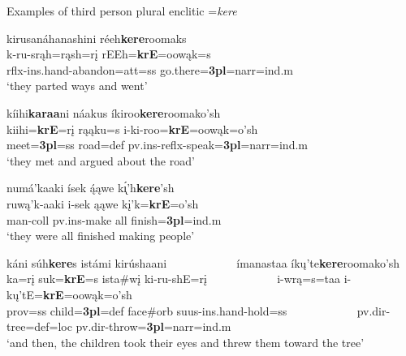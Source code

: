 \begin{exe}

\item\label{3rdpersonplural} Examples of third person plural enclitic =\textit{kere}

	\begin{xlist}
	
	\item\label{3rdpersonplural1}
	\glll kirusanáhanashini réeh\textbf{kere}roomaks\\
	k-ru-srąh=rąsh=rį rEEh=\textbf{krE}=oowąk=s\\
	rflx-ins.hand-\textnormal{abandon}=att=ss \textnormal{go.there}=\textbf{3pl}=narr=ind.m\\
	\glt `they parted ways and went' \citep[9]{hollow1973a}

	\item\label{3rdpersonplural2}
	\glll kíihi\textbf{karaa}ni náakus íkiroo\textbf{kere}roomako'sh\\
	kiihi=\textbf{krE}=rį rąąku=s i-ki-roo=\textbf{krE}=oowąk=o'sh\\
	\textnormal{meet}=\textbf{3pl}=ss \textnormal{road}=def pv.ins-reflx-\textnormal{speak}=\textbf{3pl}=narr=ind.m\\
	\glt `they met and argued about the road' \citep[24]{hollow1973a}

	\item\label{3rdpersonplural3}
	\glll numá'kaaki ísek ą́ąwe k\'{ı̨}'h\textbf{kere}'sh\\
	ruwą'k-aaki i-sek ąąwe kį'k=\textbf{krE}=o'sh\\
	\textnormal{man}-coll pv.ins-\textnormal{make} \textnormal{all} \textnormal{finish}=\textbf{3pl}=ind.m\\
	\glt `they were all finished making people' \citep[13]{hollow1973a}

	\item\label{3rdpersonplural4}
	\glll káni súh\textbf{kere}s istámi kirúshaani ~ ~ ~ ~ ~ ~ ~ ímanastaa íkų'te\textbf{kere}roomako'sh\\
	ka=rį suk=\textbf{krE}=s ista\#wį ki-ru-shE=rį ~ ~ ~ ~ ~ ~ ~  i-wrą=s=taa i-kų'tE=\textbf{krE}=oowąk=o'sh\\
	prov=ss \textnormal{child}=\textbf{3pl}=def \textnormal{face}\#\textnormal{orb} suus-ins.hand-\textnormal{hold}=ss ~ ~ ~ ~ ~ ~ ~  pv.dir-\textnormal{tree}=def=loc pv.dir-\textnormal{throw}=\textbf{3pl}=narr=ind.m\\
	\glt `and then, the children took their eyes and threw them toward the tree' \citep[29]{hollow1973a}


\end{xlist}
\end{exe}
